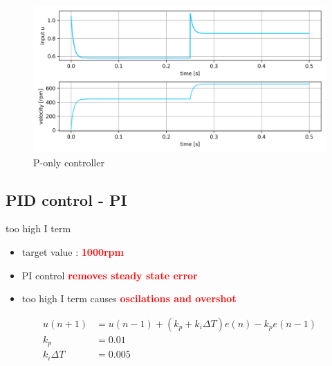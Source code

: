 \documentclass[12pt,twoside,onecolumn,openany,extrafontsizes,dvipsnames]{memoir}
\begin{document}
                    \begin{figure}[!htb]
                        \centering
                        \includegraphics[scale=0.8]{../images/motor_control/pid_p_control.png}
                        \caption{P-only controller}
                        \label{fig:p_controller}
                    \end{figure}

                \newpage
                \subsection{PID control - PI}
                    
                    too high I term 

                    \begin{itemize}
                        \item  target value : \textcolor{red}{\textbf {1000rpm}}
                        \item  PI control \textcolor{red}{\textbf {removes steady state error}}
                        \item  too high I term causes \textcolor{red}{\textbf {oscilations and overshot}}
                    \end{itemize}
                
                
                    \begin{align}
                        u(n+1) &= u(n-1) + (k_p + k_i\Delta T) e(n) - k_pe(n-1) \\
                        k_p    &= 0.01 \\
                        k_i\Delta T    &= 0.005
                    \end{align}
                    
\end{document}
